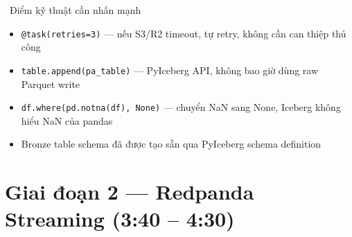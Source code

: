 \documentclass[12pt, a4paper]{article}
\newcommand{\code}[1]{\texttt{\small#1}}
\begin{document}
\begin{keybox}{\faKey\ Điểm kỹ thuật cần nhấn mạnh}
\begin{itemize}[leftmargin=1.5em, itemsep=4pt]
  \item \code{@task(retries=3)} --- nếu S3/R2 timeout, tự retry, không cần can thiệp thủ công
  \item \code{table.append(pa\_table)} --- PyIceberg API, không bao giờ dùng raw Parquet write
  \item \code{df.where(pd.notna(df), None)} --- chuyển NaN sang None, Iceberg không hiểu NaN của pandas
  \item Bronze table schema đã được tạo sẵn qua PyIceberg schema definition
\end{itemize}
\end{keybox}

\newpage

\section{Giai đoạn 2 --- Redpanda Streaming (3:40 -- 4:30)}
\end{document}
